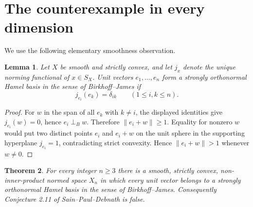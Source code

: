 \documentclass[11pt]{article}
\newtheorem{theorem}{Theorem}
\newtheorem{lemma}[theorem]{Lemma}
\newcommand{\BJ}{\mathrel{\perp_{\!B}}}
\begin{document}
\section{The counterexample in every dimension}

We use the following elementary smoothness observation.

\begin{lemma}\label{lem:strong}
Let $X$ be smooth and strictly convex, and let $j_x$ denote the unique
norming functional of $x\in S_X$.  Unit vectors $e_1,\ldots,e_n$ form a
strongly orthonormal Hamel basis in the sense of Birkhoff--James if
\[
 j_{e_i}(e_k)=\delta_{ik}\qquad(1\le i,k\le n).
\]
\end{lemma}

\begin{proof}
For $w$ in the span of all $e_k$ with $k\ne i$, the displayed identities
give $j_{e_i}(w)=0$, hence $e_i\BJ w$.  Therefore
$\|e_i+w\|\ge1$.  Equality for nonzero $w$ would put two distinct points
$e_i$ and $e_i+w$ on the unit sphere in the supporting hyperplane
$j_{e_i}=1$, contradicting strict convexity.  Hence
$\|e_i+w\|>1$ whenever $w\ne0$.
\end{proof}

\begin{theorem}\label{thm:main}
For every integer $n\ge3$ there is a smooth, strictly convex,
non-inner-product normed space $X_n$ in which every unit vector belongs to a
strongly orthonormal Hamel basis in the sense of Birkhoff--James.
Consequently Conjecture 2.11 of Sain--Paul--Debnath is false.
\end{theorem}
\end{document}
